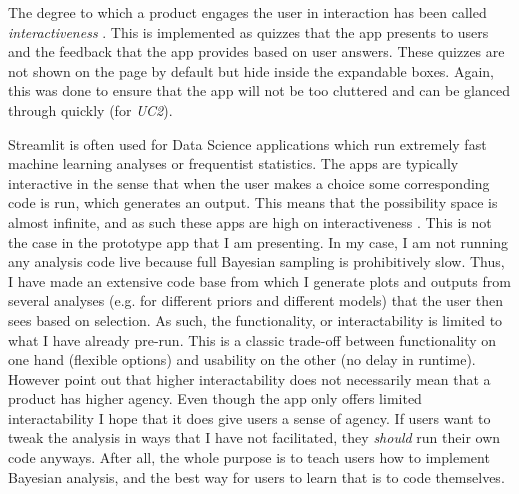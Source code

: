 \documentclass[12pt]{article}
\begin{document}
\vspace{5mm}

The degree to which a
product engages the user in interaction has been called \emph{interactiveness}
\autocite{janlert2017meaning}. This is implemented as quizzes that the app
presents to users and the feedback that the app provides based on user answers.
These quizzes are not shown on the page by default but hide inside the expandable boxes.
Again, this was done to ensure that the app will not be too cluttered and can be glanced
through quickly (for \emph{UC2}).

\vspace{5mm}

Streamlit is often used for Data Science applications which run extremely
fast machine learning analyses or frequentist statistics. The apps are typically
interactive in the sense that when the user makes a choice some corresponding code is run,
which generates an output. This means that the possibility space is almost
infinite, and as such these apps are high on interactiveness
\autocite{janlert2017meaning}. This is not the case in the prototype app that
I am presenting. In my case, I am not running any analysis code live because full
Bayesian sampling is prohibitively slow. Thus, I have made an extensive code base
from which I generate plots and outputs from several analyses
(e.g. for different priors and different models) that the user then sees based on
selection. As such, the functionality, or interactability is limited to what I
have already pre-run. This is a classic trade-off between functionality on one
hand (flexible options) and usability on the other (no delay in runtime).
However \textcite{janlert2017meaning} point out that higher interactability
does not necessarily mean that a product has higher agency. Even though the
app only offers limited interactability I hope that it does give users a
sense of agency. If users want to tweak the analysis in ways that I have not
facilitated, they \emph{should} run their own code anyways. After all, the whole
purpose is to teach users how to implement Bayesian analysis,
and the best way for users to learn that is to code themselves.
\end{document}
